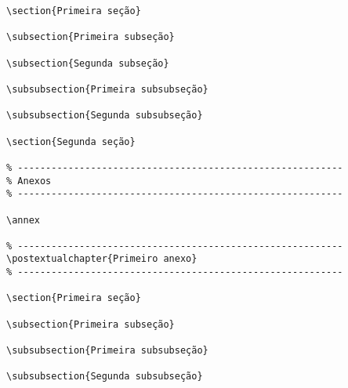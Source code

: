\documentclass[a4paper,12pt,oneside,onecolumn]{article}
\begin{document}
\begin{verbatim}
\section{Primeira seção}

\subsection{Primeira subseção}

\subsection{Segunda subseção}

\subsubsection{Primeira subsubseção}

\subsubsection{Segunda subsubseção}

\section{Segunda seção}

% ----------------------------------------------------------
% Anexos
% ----------------------------------------------------------

\annex

% ----------------------------------------------------------
\postextualchapter{Primeiro anexo}
% ----------------------------------------------------------

\section{Primeira seção}

\subsection{Primeira subseção}

\subsubsection{Primeira subsubseção}

\subsubsection{Segunda subsubseção}


\end{verbatim}
\end{document}

